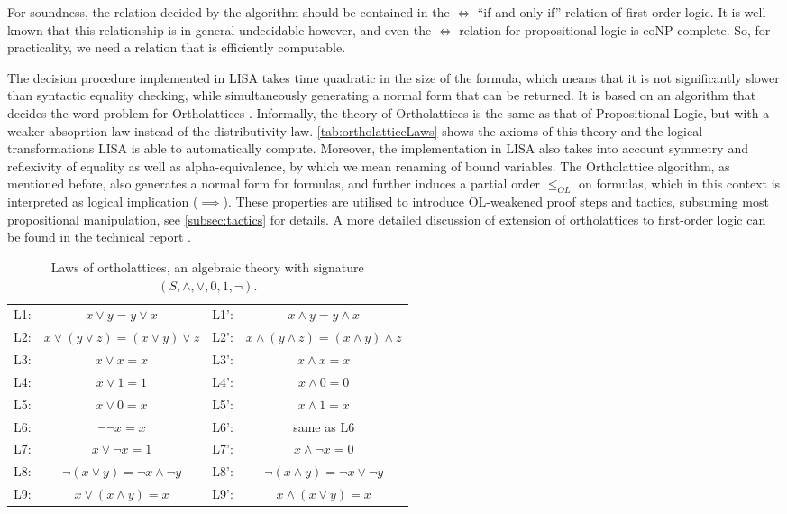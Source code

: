 For soundness, the relation decided by the algorithm should be contained in the $\Longleftrightarrow$ ``if and only if'' relation of first order logic. It is well known that this relationship is in general undecidable however, and even the $\Longleftrightarrow$ relation for propositional logic is coNP-complete. So, for practicality, we need a relation that is efficiently computable.

The decision procedure implemented in LISA takes time quadratic in the size of the formula, which means that it is not significantly slower than syntactic equality checking, while simultaneously generating a normal form that can be returned. 
It is based on an algorithm that decides the word problem for Ortholattices \cite{Guilloud:297701}. 
Informally, the theory of Ortholattices is the same as that of Propositional Logic, but with a weaker absoprtion law instead of the distributivity law. \autoref{tab:ortholatticeLaws} shows the axioms of this theory and the logical transformations LISA is able to automatically compute.
Moreover, the implementation in LISA also takes into account symmetry and reflexivity of equality as well as alpha-equivalence, by which we mean renaming of bound variables. 
The Ortholattice algorithm, as mentioned before, also generates a normal form for formulas, and further induces a partial order $\leq_{OL}$ on formulas, which in this context is interpreted as logical implication ($\implies$). These properties are utilised to introduce OL-weakened proof steps and tactics, subsuming most propositional manipulation, see \autoref{subsec:tactics} for details.
%
A more detailed discussion of extension of ortholattices to first-order logic can be found in the technical report \cite{Guilloud:300562}.

\begin{table}[bth]
  \centering
  \begin{tabular}{r c @{\hskip 2em} | @{\hskip 2em} r c}
       L1: & $x \lor y = y \lor x$  & L1': & $x \land y = y \land x$ \\
       L2: & $x \lor ( y \lor z) = (x \lor y) \lor z$  & L2': & $x \land ( y \land z) = (x \land y) \land z$ \\
       L3: & $x \lor x = x$  & L3': & $x \land x = x$ \\
       L4: & $x \lor 1 = 1$  & L4': & $x \land 0 = 0$ \\
       L5: & $x \lor 0 = x$  & L5': & $x \land 1 = x$ \\
       L6: & $\neg \neg x = x$  & L6': & same as L6  \\
       L7: & $x \lor \neg x = 1$  & L7': & $x \land \neg x = 0$ \\
       L8: & $\neg (x \lor y) = \neg x \land \neg y$  & L8': &  $\neg (x \land y) = \neg x \lor \neg y$ \\
       L9: & $x \lor (x \land y) = x$ & L9': & $x \land (x \lor y) = x$   \\
  \end{tabular}
  \caption{Laws of ortholattices, an algebraic theory with signature $(S, \land, \lor, 0, 1, \neg)$. \cite{Guilloud:297701}}
  \label{tab:ortholatticeLaws}
\end{table}


